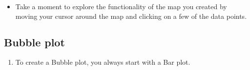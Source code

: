 \documentclass[
]{book}
\providecommand{\tightlist}{%
  \setlength{\itemsep}{0pt}\setlength{\parskip}{0pt}}
\begin{document}
\begin{enumerate}
  \begin{itemize}
  \tightlist
  \item
    Take a moment to explore the functionality of the map you created by moving your cursor around the map and clicking on a few of the data points.
  \end{itemize}
\end{enumerate}

\hypertarget{bubble-plot}{%
\subsection{Bubble plot}\label{bubble-plot}}

\begin{enumerate}
\def\labelenumi{\arabic{enumi}.}
\tightlist
\item
  To create a Bubble plot, you always start with a Bar plot.


\end{enumerate}
\end{document}

